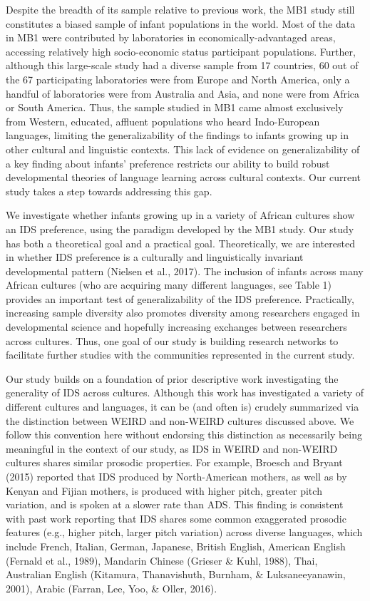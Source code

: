 \documentclass[
  ,man,floatsintext]{apa6}
\begin{document}
Despite the breadth of its sample relative to previous work, the MB1 study still constitutes a biased sample of infant populations in the world. Most of the data in MB1 were contributed by laboratories in economically-advantaged areas, accessing relatively high socio-economic status participant populations. Further, although this large-scale study had a diverse sample from 17 countries, 60 out of the 67 participating laboratories were from Europe and North America, only a handful of laboratories were from Australia and Asia, and none were from Africa or South America. Thus, the sample studied in MB1 came almost exclusively from Western, educated, affluent populations who heard Indo-European languages, limiting the generalizability of the findings to infants growing up in other cultural and linguistic contexts. This lack of evidence on generalizability of a key finding about infants' preference restricts our ability to build robust developmental theories of language learning across cultural contexts. Our current study takes a step towards addressing this gap.

We investigate whether infants growing up in a variety of African cultures show an IDS preference, using the paradigm developed by the MB1 study. Our study has both a theoretical goal and a practical goal. Theoretically, we are interested in whether IDS preference is a culturally and linguistically invariant developmental pattern (Nielsen et al., 2017). The inclusion of infants across many African cultures (who are acquiring many different languages, see Table 1) provides an important test of generalizability of the IDS preference. Practically, increasing sample diversity also promotes diversity among researchers engaged in developmental science and hopefully increasing exchanges between researchers across cultures. Thus, one goal of our study is building research networks to facilitate further studies with the communities represented in the current study.

Our study builds on a foundation of prior descriptive work investigating the generality of IDS across cultures. Although this work has investigated a variety of different cultures and languages, it can be (and often is) crudely summarized via the distinction between WEIRD and non-WEIRD cultures discussed above. We follow this convention here without endorsing this distinction as necessarily being meaningful in the context of our study, as IDS in WEIRD and non-WEIRD cultures shares similar prosodic properties. For example, Broesch and Bryant (2015) reported that IDS produced by North-American mothers, as well as by Kenyan and Fijian mothers, is produced with higher pitch, greater pitch variation, and is spoken at a slower rate than ADS. This finding is consistent with past work reporting that IDS shares some common exaggerated prosodic features (e.g., higher pitch, larger pitch variation) across diverse languages, which include French, Italian, German, Japanese, British English, American English (Fernald et al., 1989), Mandarin Chinese (Grieser \& Kuhl, 1988), Thai, Australian English (Kitamura, Thanavishuth, Burnham, \& Luksaneeyanawin, 2001), Arabic (Farran, Lee, Yoo, \& Oller, 2016).
\end{document}
